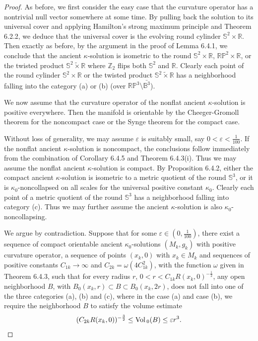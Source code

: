 \begin{proof}
As before, we first consider the easy case that the curvature
operator has a nontrivial null vector somewhere at some time. By
pulling back the solution to its universal cover and applying
Hamilton's strong maximum principle and Theorem 6.2.2, we deduce
that the universal cover is the evolving round cylinder
$\mathbb{S}^2 \times \mathbb{R}$. Then exactly as before, by the
argument in the proof of Lemma 6.4.1, we conclude that the ancient
$\kappa$-solution is isometric to the round $\mathbb{S}^2 \times
\mathbb{R}$, $\mathbb{R}\mathbb{P}^2 \times \mathbb{R}$, or the
twisted product $\mathbb{S}^2 \tilde{\times} \mathbb{R}$ where
$\mathbb{Z}_2$ flips both $\mathbb{S}^2$ and $\mathbb{R}$. Clearly
each point of the round cylinder $\mathbb{S}^2 \times \mathbb{R}$
or the twisted product $\mathbb{S}^2 \tilde{\times} \mathbb{R}$
has a neighborhood falling into the category (a) or (b) (over
$\mathbb{R}\mathbb{P}^3\setminus\bar{\mathbb{B}^3}$).

We now assume that the curvature operator of the nonflat ancient
$\kappa$-solution is positive everywhere. Then the manifold is
orientable by the Cheeger-Gromoll theorem \cite{CG} for the
noncompact case or the Synge theorem \cite{CE} for the compact
case.

Without loss of generality, we may assume $\varepsilon$ is
suitably small, say $0<\varepsilon < \frac{1}{100}$. If the
nonflat ancient $\kappa$-solution is noncompact, the conclusions
follow immediately from the combination of Corollary 6.4.5 and
Theorem 6.4.3(i). Thus we may assume the nonflat ancient
$\kappa$-solution is compact. By Proposition 6.4.2, either the
compact ancient $\kappa$-solution is isometric to a metric
quotient of the round $\mathbb{S}^3$, or it is
$\kappa_0$-noncollapsed on all scales for the universal positive
constant $\kappa_0$. Clearly each point of a metric quotient of
the round $\mathbb{S}^3$ has a neighborhood falling into category
(c). Thus we may further assume the ancient $\kappa$-solution is
also $\kappa_0$-noncollapsing.

We argue by contradiction. Suppose that for some $\varepsilon \in
(0, \frac{1}{100})$, there exist a sequence of compact orientable
ancient $\kappa_0$-solutions $(M_k,g_k)$ with positive curvature
operator, a sequence of points $(x_k,0)$ with $x_k\in M_k$ and
sequences of positive constants $C_{1k}\rightarrow\infty$ and
$C_{2k}=\omega(4C^2_{1k})$, with the function $\omega$ given in
Theorem 6.4.3, such that for every radius $r$,
$0<r<C_{1k}R(x_k,0)^{-\frac{1}{2}}$, any open neighborhood $B$,
with $B_0(x_k,r) \subset B \subset B_0(x_k,2r)$, does not fall
into one of the three categories (a), (b) and (c), where in the
case (a) and case (b), we require the neighborhood $B$ to satisfy
the volume estimate
$$
(C_{2k}R(x_k,0))^{-\frac{3}{2}} \leq {\rm Vol}\,_0(B) \leq \varepsilon
r^3.
$$


\end{proof}
